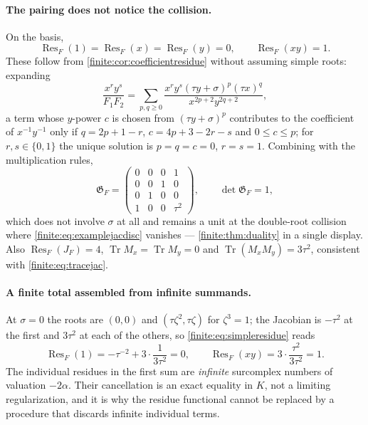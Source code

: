 \documentclass[11pt,letterpaper]{article}
\theoremstyle{definition}
\theoremstyle{remark}
\newcommand{\Gram}{\mathfrak G}
\DeclareMathOperator{\Res}{Res}
\DeclareMathOperator{\Tr}{Tr}
\numberwithin{equation}{section}
\begin{document}
\paragraph{The pairing does not notice the collision.}
On the basis,
\begin{equation}\label{finite:eq:exampleresvalues}
 \Res_F(1)=\Res_F(x)=\Res_F(y)=0,\qquad \Res_F(xy)=1 .
\end{equation}
These follow from \cref{finite:cor:coefficientresidue} without assuming simple roots: expanding
\[
 \frac{x^ry^s}{F_1F_2}
 =\sum_{p,q\geq0}\frac{x^ry^s(\tau y+\sigma)^p(\tau x)^q}{x^{2p+2}y^{2q+2}},
\]
a term whose $y$-power $c$ is chosen from $(\tau y+\sigma)^p$ contributes to the coefficient of $x^{-1}y^{-1}$ only if $q=2p+1-r$, $c=4p+3-2r-s$ and $0\leq c\leq p$; for $r,s\in\{0,1\}$ the unique solution is $p=q=c=0$, $r=s=1$. Combining with the multiplication rules,
\begin{equation}\label{finite:eq:examplegram}
 \Gram_F=\begin{pmatrix}0&0&0&1\\0&0&1&0\\0&1&0&0\\1&0&0&\tau^2\end{pmatrix},
 \qquad\det\Gram_F=1,
\end{equation}
which does not involve $\sigma$ at all and remains a unit at the double-root collision where \eqref{finite:eq:examplejacdisc} vanishes --- \cref{finite:thm:duality} in a single display. Also $\Res_F(J_F)=4$, $\Tr M_x=\Tr M_y=0$ and $\Tr(M_xM_y)=3\tau^2$, consistent with \eqref{finite:eq:tracejac}.

\paragraph{A finite total assembled from infinite summands.}
At $\sigma=0$ the roots are $(0,0)$ and $(\tau\zeta^2,\tau\zeta)$ for $\zeta^3=1$; the Jacobian is $-\tau^2$ at the first and $3\tau^2$ at each of the others, so \eqref{finite:eq:simpleresidue} reads
\begin{equation}\label{finite:eq:infiniterescancel}
 \Res_F(1)=-\tau^{-2}+3\cdot\frac1{3\tau^2}=0,
 \qquad
 \Res_F(xy)=3\cdot\frac{\tau^2}{3\tau^2}=1 .
\end{equation}
The individual residues in the first sum are \emph{infinite} surcomplex numbers of valuation $-2\alpha$. Their cancellation is an exact equality in $K$, not a limiting regularization, and it is why the residue functional cannot be replaced by a procedure that discards infinite individual terms.
\end{document}
